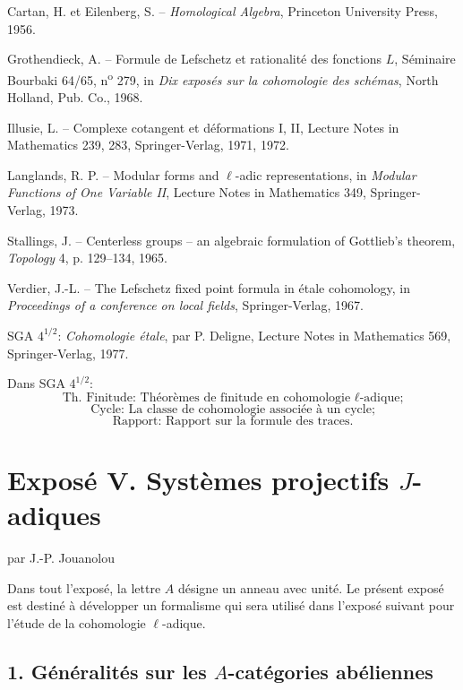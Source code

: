 \documentclass[11pt]{article}
\begin{document}
\begin{enumerate}[label={[\arabic*]}]
\item Cartan, H. et Eilenberg, S. -- \textit{Homological Algebra}, Princeton University Press, 1956.
\item Grothendieck, A. -- Formule de Lefschetz et rationalité des fonctions $L$, Séminaire Bourbaki 64/65, n\textsuperscript{o} 279, in \textit{Dix exposés sur la cohomologie des schémas}, North Holland, Pub. Co., 1968.
\item Illusie, L. -- Complexe cotangent et déformations I, II, Lecture Notes in Mathematics 239, 283, Springer-Verlag, 1971, 1972.
\item Langlands, R. P. -- Modular forms and $\ell$-adic representations, in \textit{Modular Functions of One Variable II}, Lecture Notes in Mathematics 349, Springer-Verlag, 1973.
\item Stallings, J. -- Centerless groups -- an algebraic formulation of Gottlieb's theorem, \textit{Topology} 4, p. 129--134, 1965.
\item Verdier, J.-L. -- The Lefschetz fixed point formula in étale cohomology, in \textit{Proceedings of a conference on local fields}, Springer-Verlag, 1967.
\end{enumerate}

SGA $4^{1/2}$: \textit{Cohomologie étale}, par P. Deligne, Lecture Notes in Mathematics 569, Springer-Verlag, 1977.

Dans SGA $4^{1/2}$:
\[
\text{Th. Finitude: Théorèmes de finitude en cohomologie }\ell\text{-adique;}
\]
\[
\text{Cycle: La classe de cohomologie associée à un cycle;}
\]
\[
\text{Rapport: Rapport sur la formule des traces.}
\]


\section*{Exposé V. Systèmes projectifs $J$-adiques}
\begin{center}par J.-P. Jouanolou\end{center}

Dans tout l'exposé, la lettre $A$ désigne un anneau avec unité. Le présent exposé est destiné à développer un formalisme qui sera utilisé dans l'exposé suivant pour l'étude de la cohomologie $\ell$-adique.

\subsection*{1. Généralités sur les $A$-catégories abéliennes}
\end{document}
